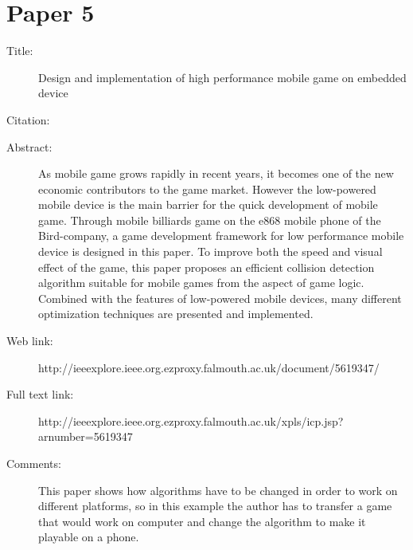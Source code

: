 \documentclass{scrartcl}
\begin{document}
\section*{Paper 5}
\begin{description}
\item[Title:] Design and implementation of high performance mobile game on embedded device
\item[Citation:] \cite{yang2010design}
\item[Abstract:] As mobile game grows rapidly in recent years, it becomes one of the new economic contributors to the game market. However the low-powered mobile device is the main barrier for the quick development of mobile game. Through mobile billiards game on the e868 mobile phone of the Bird-company, a game development framework for low performance mobile device is designed in this paper. To improve both the speed and visual effect of the game, this paper proposes an efficient collision detection algorithm suitable for mobile games from the aspect of game logic. Combined with the features of low-powered mobile devices, many different optimization techniques are presented and implemented.
\item[Web link:] http://ieeexplore.ieee.org.ezproxy.falmouth.ac.uk/document/5619347/
\item[Full text link:] http://ieeexplore.ieee.org.ezproxy.falmouth.ac.uk/xpls/icp.jsp?arnumber=5619347
\item[Comments:] This paper shows how algorithms have to be changed in order to work on different platforms, so in this example the author has to transfer a game that would work on computer and change the algorithm to make it playable on a phone.
\end{description}



\end{document}
